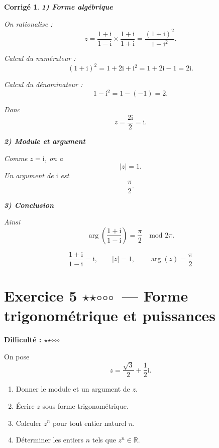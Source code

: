 \documentclass[11pt,a4paper]{article}
\newtheorem*{corrige}{Corrigé}
\newcommand{\R}{\mathbb{R}}
\newcommand{\ii}{\mathrm{i}}
\newcommand{\fullstar}{\(\star\)}
\newcommand{\emptystar}{\(\circ\)}
\newcommand{\twoStars}{\fullstar\fullstar\emptystar\emptystar\emptystar}
\newcommand{\difficulty}[1]{\textbf{Difficulté : #1}}
\begin{document}
\begin{corrige}
\textbf{1) Forme algébrique}

On rationalise :
\[
z=\frac{1+\ii}{1-\ii}\times \frac{1+\ii}{1+\ii}
=\frac{(1+\ii)^2}{1-\ii^2}.
\]

Calcul du numérateur :
\[
(1+\ii)^2=1+2\ii+\ii^2=1+2\ii-1=2\ii.
\]

Calcul du dénominateur :
\[
1-\ii^2=1-(-1)=2.
\]

Donc
\[
z=\frac{2\ii}{2}=\ii.
\]

\textbf{2) Module et argument}

Comme \(z=\ii\), on a
\[
|z|=1.
\]
Un argument de \(\ii\) est
\[
\frac{\pi}{2}.
\]

\textbf{3) Conclusion}

Ainsi
\[
\arg\left(\frac{1+\ii}{1-\ii}\right)=\frac{\pi}{2}\quad \text{mod }2\pi.
\]

\[
\boxed{\frac{1+\ii}{1-\ii}=\ii,\qquad |z|=1,\qquad \arg(z)=\frac{\pi}{2}}
\]
\end{corrige}

\section{Exercice 5 \twoStars\ --- Forme trigonométrique et puissances}
\difficulty{\twoStars}

On pose
\[
z=\frac{\sqrt3}{2}+\frac12 \ii.
\]

\begin{enumerate}
    \item Donner le module et un argument de \(z\).
    \item Écrire \(z\) sous forme trigonométrique.
    \item Calculer \(z^n\) pour tout entier naturel \(n\).
    \item Déterminer les entiers \(n\) tels que \(z^n\in\R\).
\end{enumerate}
\end{document}
